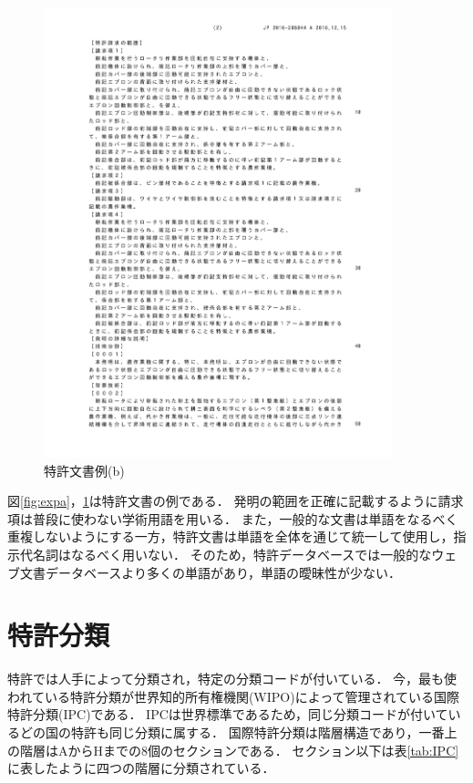 \documentclass[master]{suribt}
\theoremstyle{definition}
\begin{document}
 \begin{figure}
  \includegraphics[width=0.9\textwidth,bb= 79 54 557 761]{ex1-2.pdf}
  \caption{特許文書例(b)}
  \label{fig:expb}
 \end{figure}

 図\ref{fig:expa}，\ref{fig:expb}は特許文書の例である．
 発明の範囲を正確に記載するように請求項は普段に使わない学術用語を用いる． また，一般的な文書は単語をなるべく重複しないようにする一方，特許文書は単語を全体を通じて統一して使用し，指示代名詞はなるべく用いない．
 そのため，特許データベースでは一般的なウェブ文書データベースより多くの単語があり，単語の曖昧性が少ない．
 
 \section{特許分類}
 特許では人手によって分類され，特定の分類コードが付いている．
 今，最も使われている特許分類が世界知的所有権機関(WIPO)によって管理されている国際特許分類(IPC)である．
 IPCは世界標準であるため，同じ分類コードが付いているどの国の特許も同じ分類に属する．
 国際特許分類は階層構造であり，一番上の階層はAからHまでの8個のセクションである．
 セクション以下は表\ref{tab:IPC}に表したように四つの階層に分類されている．
 
\end{document}
